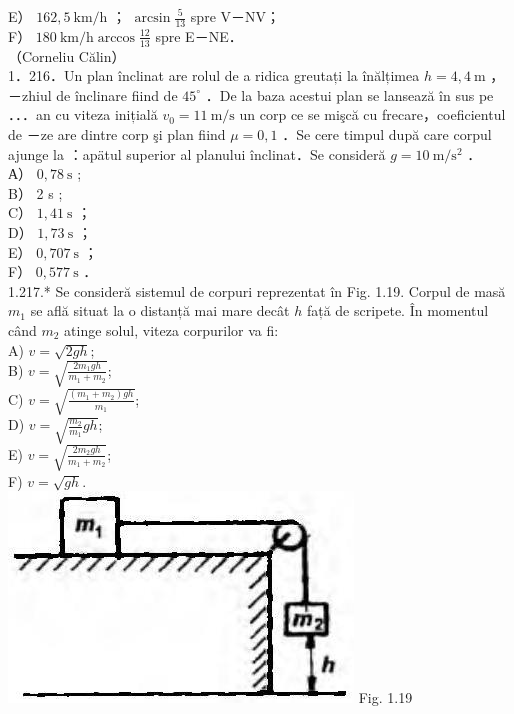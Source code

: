 \documentclass[10pt]{article}
\begin{document}
E） $162,5 \mathrm{~km} / \mathrm{h}$ ； $\arcsin \frac{5}{13}$ spre V－NV；\\
F） $180 \mathrm{~km} / \mathrm{h} \arccos \frac{12}{13}$ spre E－NE．\\
（Corneliu Călin）\\
1．216．Un plan înclinat are rolul de a ridica greutați la înălțimea $h=4,4 \mathrm{~m}$ ， －zhiul de înclinare fiind de $45^{\circ}$ ．De la baza acestui plan se lansează în sus pe ．．．an cu viteza inițială $v_{0}=11 \mathrm{~m} / \mathrm{s}$ un corp ce se mişcă cu frecare，coeficientul de －ze are dintre corp şi plan fiind $\mu=0,1$ ．Se cere timpul după care corpul ajunge la ：apätul superior al planului înclinat．Se consideră $g=10 \mathrm{~m} / \mathrm{s}^{2}$ ．\\
А） $0,78 \mathrm{~s}$ ;\\
B） 2 s ;\\
C） $1,41 \mathrm{~s}$ ；\\
D） $1,73 \mathrm{~s}$ ；\\
E） $0,707 \mathrm{~s}$ ；\\
F） $0,577 \mathrm{~s}$ ．\\
1.217.* Se consideră sistemul de corpuri reprezentat în Fig. 1.19. Corpul de masă $m_{1}$ se află situat la o distanță mai mare decât $h$ față de scripete. În momentul când $m_{2}$ atinge solul, viteza corpurilor va fi:\\

A) $v=\sqrt{2 g h}$;\\
B) $v=\sqrt{\frac{2 m_{1} g h}{m_{1}+m_{2}}}$;\\
C) $v=\sqrt{\frac{\left(m_{1}+m_{2}\right) g h}{m_{1}}}$;\\
D) $v=\sqrt{\frac{m_{2}}{m_{1}} g h}$;\\
E) $v=\sqrt{\frac{2 m_{2} g h}{m_{1}+m_{2}}}$;\\
F) $v=\sqrt{g h}$.\\
\includegraphics[max width=\textwidth, center]{2025_07_01_5b3ff9fa0d508c8e9f17g-050} Fig. 1.19\\
\end{document}
